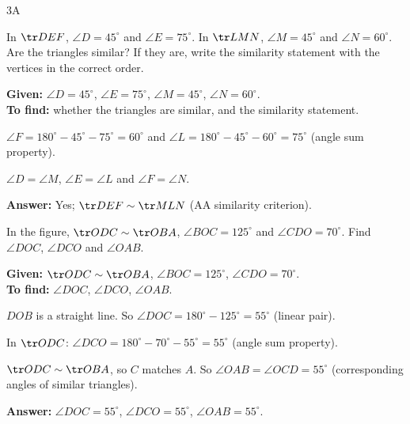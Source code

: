 \begin{exercise}{3A}
\item In $\tr DEF$, $\angle D=45^\circ$ and $\angle E=75^\circ$. In $\tr LMN$, $\angle M=45^\circ$ and $\angle N=60^\circ$. Are the triangles similar? If they are, write the similarity statement with the vertices in the correct order.
\begin{solution}
\textbf{Given:} $\angle D=45^\circ$, $\angle E=75^\circ$, $\angle M=45^\circ$, $\angle N=60^\circ$.\\
\textbf{To find:} whether the triangles are similar, and the similarity statement.
\begin{steps}
  \item $\angle F=180^\circ-45^\circ-75^\circ=60^\circ$ and $\angle L=180^\circ-45^\circ-60^\circ=75^\circ$ (angle sum property).
  \item $\angle D=\angle M$, $\angle E=\angle L$ and $\angle F=\angle N$.
\end{steps}
\textbf{Answer:} Yes; $\tr DEF\sim\tr MLN$ (AA similarity criterion).
\end{solution}

\item In the figure, $\tr ODC\sim\tr OBA$, $\angle BOC=125^\circ$ and $\angle CDO=70^\circ$. Find $\angle DOC$, $\angle DCO$ and $\angle OAB$.
\begin{solution}
\textbf{Given:} $\tr ODC\sim\tr OBA$, $\angle BOC=125^\circ$, $\angle CDO=70^\circ$.\\
\textbf{To find:} $\angle DOC$, $\angle DCO$, $\angle OAB$.
\begin{steps}
  \item $DOB$ is a straight line. So $\angle DOC=180^\circ-125^\circ=55^\circ$ (linear pair).
  \item In $\tr ODC$: $\angle DCO=180^\circ-70^\circ-55^\circ=55^\circ$ (angle sum property).
  \item $\tr ODC\sim\tr OBA$, so $C$ matches $A$. So $\angle OAB=\angle OCD=55^\circ$ (corresponding angles of similar triangles).
\end{steps}
\textbf{Answer:} $\angle DOC=55^\circ$, $\angle DCO=55^\circ$, $\angle OAB=55^\circ$.
\end{solution}


\end{exercise}
